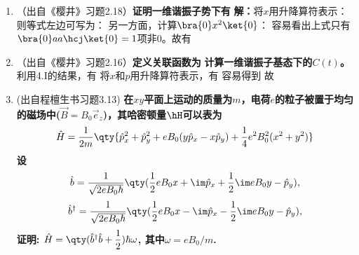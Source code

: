 \begin{enumerate}[label=\textbf{4.A\arabic*}, listparindent=\parindent]
    \item（出自《樱井》习题2.18）\textbf{证明一维谐振子势下有}
    \textbf{解：}将$x$用升降算符表示：
    则等式左边可写为：
    另一方面，计算$\bra{0}x^2\ket{0}$：
    容易看出上式只有$\bra{0}aa\hcj\ket{0}=1$项非0。故有
    
    \item（出自《樱井》习题2.16）\textbf{定义关联函数为}
    \textbf{计算一维谐振子基态下的$C(t)$。}\\
    利用4.I的结果，有
    将$x$和$p$用升降算符表示，有
    容易得到
    故

\item (出自程檀生书习题3.13) \textbf{在$xy$平面上运动的质量为$m$，电荷$e$的粒子被置于均匀的磁场中($\vec{B}=B_0\vec{e}_z$)，其哈密顿量$\hH$可以表为
\[\hat{H}=\frac{1}{2m}\qty{\hat{p}_x^2+\hat{p}_y^2+eB_0(y\hat{p}_x-x\hat{p}_y)+\frac{1}{4}e^2B_0^2(x^2+y^2)}\]
设\[\hat{b} = \frac{1}{\sqrt{2eB_0 \hbar}}\qty(\frac{1}{2}eB_0x + \im\hat{p}_x+\frac{1}{2}\im eB_0 y-\hat{p}_y),\]
\[\hat{b}^\dagger = \frac{1}{\sqrt{2eB_0 \hbar}}\qty(\frac{1}{2}eB_0x -\im\hat{p}_x-\frac{1}{2}\im eB_0 y-\hat{p}_y),\]
证明: $\hat{H}=\qty(\hat{b}^\dagger\hat{b}+\dfrac{1}{2})\hbar\omega$, 其中$\omega=eB_0/m$.
}


\end{enumerate}
